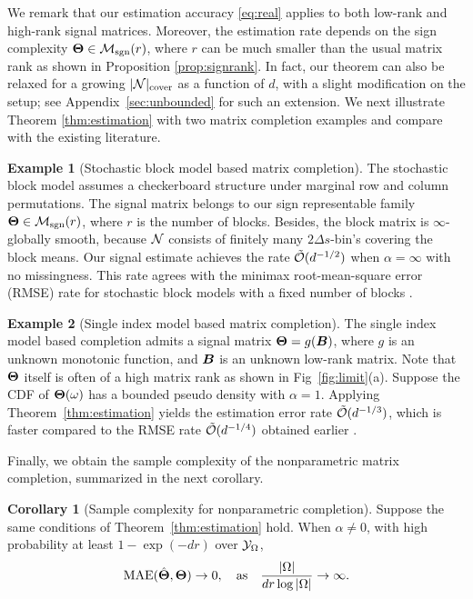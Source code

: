 \documentclass[11pt]{article}
\theoremstyle{plain}
\theoremstyle{definition}
\newtheorem{corollary}{Corollary}
\newtheorem{example}{Example}
\def\caliM{\tM_{\textup{sgn}}}
\def\caliM{\tM_{\textup{sgn}}}
\begin{document}
\noindent
We remark that our estimation accuracy \eqref{eq:real} applies to both low-rank and high-rank signal matrices. Moreover, the estimation rate depends on the sign complexity $\mTheta\in\caliM(r)$, where $r$ can be much smaller than the usual matrix rank as shown in Proposition \ref{prop:signrank}. In fact, our theorem can also be relaxed for a growing $|\mathcal{N}|_{\text{cover}}$ as a function of $d$, with a slight modification on the setup; see Appendix~\ref{sec:unbounded} for such an extension. We next illustrate Theorem \ref{thm:estimation} with two matrix completion examples and compare with the existing literature.  

\begin{example}[Stochastic block model based matrix completion]
The stochastic block model \citep{chi2020provable} assumes a checkerboard structure under marginal row and column permutations. The signal matrix belongs to our sign representable family $\mTheta \in \caliM(r)$, where $r$ is the number of blocks. Besides, the block matrix is $\infty$-globally smooth, because $\mathcal{N}$ consists of finitely many $2\Delta s$-bin's covering the block means. Our signal estimate achieves the rate $\tilde {\mathcal{O}}(d^{-1/2})$ when $\alpha=\infty$ with no missingness. This rate agrees with the minimax root-mean-square error (RMSE) rate for stochastic block models with a fixed number of blocks \citep{gao2016optimal}. 
\end{example}

\begin{example}[Single index model based matrix completion]
The single index model based completion \citep{ganti2015matrix} admits a signal matrix $\bm{\Theta}=g(\bm B)$, where $g$ is an unknown monotonic function, and $\bm B$ is an unknown low-rank matrix. Note that $\bm{\Theta}$ itself is often of a high matrix rank as shown in Fig~\ref{fig:limit}(a). Suppose the CDF of $\bm{\Theta}(\omega)$ has a bounded pseudo density with $\alpha=1$. Applying Theorem~\ref{thm:estimation} yields the estimation error rate $\tilde {\mathcal{O}}(d^{-1/3})$, which is faster compared to the RMSE rate $\tilde {\mathcal{O}}(d^{-1/4})$ obtained earlier \citep{ganti2015matrix}. 
\end{example}

Finally, we obtain the sample complexity of the nonparametric matrix completion, summarized in the next corollary.

\begin{corollary}[Sample complexity for nonparametric completion] \label{thm:sample-complexity}
Suppose the same conditions of Theorem~\ref{thm:estimation} hold. When $\alpha\neq 0$, with high probability at least $1-\exp(-dr)$ over $\mathcal{Y}_\Omega$, 
\begin{equation*}
\textup{MAE}(\hat {\bm{\Theta}}, \bm{\Theta})\to 0, \quad \text{as}\quad {|\Omega|\over {d} r \log|\Omega|}\to \infty.
\end{equation*}
\end{corollary}
\end{document}
